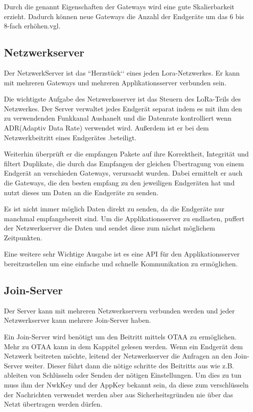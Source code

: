 \documentclass[a4paper,12pt]{article}
\begin{document}
            Durch die genannt Eigenschaften der Gateways wird eine gute Skalierbarkeit erzieht. Dadurch können neue 
            Gateways die Anzahl der Endgeräte um das 6 bis 8-fach erhöhen.vgl. \cite[S.10]{WhatIsLoRa}
        \subsection{Netzwerkserver}
            Der NetzwerkServer ist das ``Herzstück‘‘ eines jeden Lora-Netzwerkes. Er kann mit mehreren Gateways und 
            mehreren Applikationsserver verbunden sein. 

            Die wichtigste Aufgabe des Netzwerksserver ist das Steuern des LoRa-Teils des Netzwerkes. Der Server 
            verwaltet jedes Endgerät separat indem es mit ihm den zu verwendenden Funkkanal Aushanelt und die Datenrate
             kontrolliert wenn ADR(Adaptiv Data Rate) verwendet wird. Außerdem ist er bei dem Netzwerkbeitritt eines 
             Endgerätes .beteiligt.

            Weiterhin überprüft er die empfangen Pakete auf ihre Korrektheit, Integrität und filtert Duplikate, die 
            durch das Empfangen der gleichen Übertragung von einem Endgerät an verschieden Gateways, verursacht wurden.
            Dabei ermittelt er auch die Gateways, die den besten empfang zu den jeweiligen Endgeräten hat und nutzt 
            dieses um Daten an die Endgeräte zu senden.

            Es ist nicht immer möglich Daten direkt zu senden, da die Endgeräte nur manchmal empfangsbereit sind. Um 
            die Applikationsserver zu endlasten, puffert der Netzwerkserver die Daten und sendet diese zum nächst 
            möglichem Zeitpunkten.

            Eine weitere sehr Wichtige Ausgabe ist es eine API für den Applikationsserver bereitzustellen um eine 
            einfache und schnelle Kommunikation zu ermöglichen.\cite{LoRaSpec}
        \subsection{Join-Server}
            Der Server kann mit mehreren Netzwerkservern verbunden werden und jeder Netzwerkserver kann mehrere 
            Join-Server haben.

            Ein Join-Server wird benötigt um den Beitritt mittels OTAA zu ermöglichen. Mehr zu OTAA kann in dem 
            Kappitel  gelesen werden. Wenn ein Endgerät dem Netzwerk beitreten möchte, leitend 
            der Netzwerkserver die Anfragen an den Join-Server weiter. Dieser führt dann die nötige schritte des 
            Beitritts aus wie z.B. ableiten von Schlüsseln oder Senden der nötigen Einstellungen. Um dies zu tun 
            muss ihm der NwkKey und der AppKey bekannt sein, da diese zum verschlüsseln der Nachrichten verwendet 
            werden aber aus Sicherheitsgründen nie über das Netzt übertragen werden dürfen. \cite[S. 9 f.]{LoRaBack}
\end{document}
